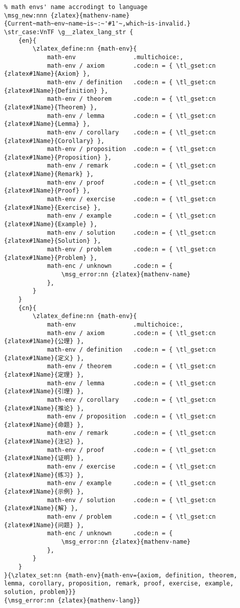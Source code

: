 \begin{verbatim}
% math envs' name accrodingt to language
\msg_new:nnn {zlatex}{mathenv-name}{Current~math~env~name~is~:~'#1'~,which~is-invalid.}
\str_case:VnTF \g__zlatex_lang_str { 
    {en}{
        \zlatex_define:nn {math-env}{
            math-env                .multichoice:,
            math-env / axiom        .code:n = { \tl_gset:cn {zlatex#1Name}{Axiom} },
            math-env / definition   .code:n = { \tl_gset:cn {zlatex#1Name}{Definition} },
            math-env / theorem      .code:n = { \tl_gset:cn {zlatex#1Name}{Theorem} },
            math-env / lemma        .code:n = { \tl_gset:cn {zlatex#1Name}{Lemma} },
            math-env / corollary    .code:n = { \tl_gset:cn {zlatex#1Name}{Corollary} },
            math-env / proposition  .code:n = { \tl_gset:cn {zlatex#1Name}{Proposition} },
            math-env / remark       .code:n = { \tl_gset:cn {zlatex#1Name}{Remark} },
            math-env / proof        .code:n = { \tl_gset:cn {zlatex#1Name}{Proof} },
            math-env / exercise     .code:n = { \tl_gset:cn {zlatex#1Name}{Exercise} },
            math-env / example      .code:n = { \tl_gset:cn {zlatex#1Name}{Example} },
            math-env / solution     .code:n = { \tl_gset:cn {zlatex#1Name}{Solution} },
            math-env / problem      .code:n = { \tl_gset:cn {zlatex#1Name}{Problem} },
            math-enc / unknown      .code:n = {
                \msg_error:nn {zlatex}{mathenv-name}
            },
        }
    }
    {cn}{
        \zlatex_define:nn {math-env}{
            math-env                .multichoice:,
            math-env / axiom        .code:n = { \tl_gset:cn {zlatex#1Name}{公理} },
            math-env / definition   .code:n = { \tl_gset:cn {zlatex#1Name}{定义} },
            math-env / theorem      .code:n = { \tl_gset:cn {zlatex#1Name}{定理} },
            math-env / lemma        .code:n = { \tl_gset:cn {zlatex#1Name}{引理} },
            math-env / corollary    .code:n = { \tl_gset:cn {zlatex#1Name}{推论} },
            math-env / proposition  .code:n = { \tl_gset:cn {zlatex#1Name}{命题} },
            math-env / remark       .code:n = { \tl_gset:cn {zlatex#1Name}{注记} },
            math-env / proof        .code:n = { \tl_gset:cn {zlatex#1Name}{证明} },
            math-env / exercise     .code:n = { \tl_gset:cn {zlatex#1Name}{练习} },
            math-env / example      .code:n = { \tl_gset:cn {zlatex#1Name}{示例} },
            math-env / solution     .code:n = { \tl_gset:cn {zlatex#1Name}{解} },
            math-env / problem      .code:n = { \tl_gset:cn {zlatex#1Name}{问题} },
            math-enc / unknown      .code:n = {
                \msg_error:nn {zlatex}{mathenv-name}
            },
        }
    }
}{\zlatex_set:nn {math-env}{math-env={axiom, definition, theorem, lemma, corollary, proposition, remark, proof, exercise, example, solution, problem}}}
{\msg_error:nn {zlatex}{mathenv-lang}}


\end{verbatim}
